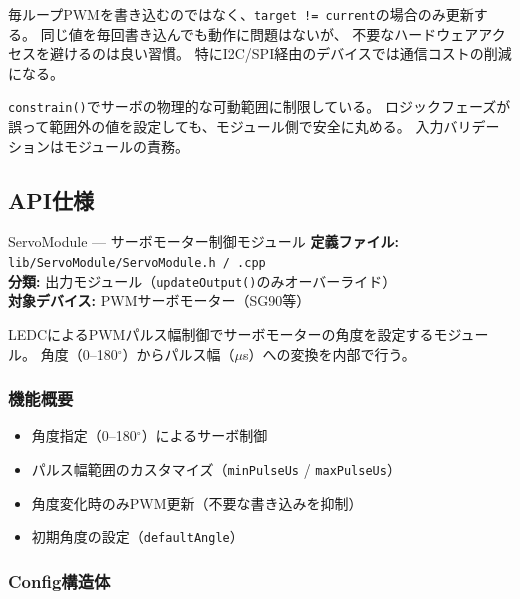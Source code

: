 \begin{pointbox}[変化検出パターン]
毎ループPWMを書き込むのではなく、\texttt{target != current}の場合のみ更新する。
同じ値を毎回書き込んでも動作に問題はないが、
不要なハードウェアアクセスを避けるのは良い習慣。
特にI2C/SPI経由のデバイスでは通信コストの削減になる。
\end{pointbox}

\begin{pointbox}[constrainによる安全性]
\texttt{constrain()}でサーボの物理的な可動範囲に制限している。
ロジックフェーズが誤って範囲外の値を設定しても、モジュール側で安全に丸める。
入力バリデーションはモジュールの責務。
\end{pointbox}

\subsection{API仕様}


\begin{apibox}{ServoModule --- サーボモーター制御モジュール}
\textbf{定義ファイル:} \texttt{lib/ServoModule/ServoModule.h / .cpp}\\
\textbf{分類:} 出力モジュール（\texttt{updateOutput()}のみオーバーライド）\\
\textbf{対象デバイス:} PWMサーボモーター（SG90等）

LEDCによるPWMパルス幅制御でサーボモーターの角度を設定するモジュール。
角度（0--180$^{\circ}$）からパルス幅（$\mu$s）への変換を内部で行う。
\end{apibox}

\subsubsection{機能概要}

\begin{itemize}
    \item 角度指定（0--180$^{\circ}$）によるサーボ制御
    \item パルス幅範囲のカスタマイズ（\texttt{minPulseUs} / \texttt{maxPulseUs}）
    \item 角度変化時のみPWM更新（不要な書き込みを抑制）
    \item 初期角度の設定（\texttt{defaultAngle}）
\end{itemize}

\subsubsection{Config構造体}

